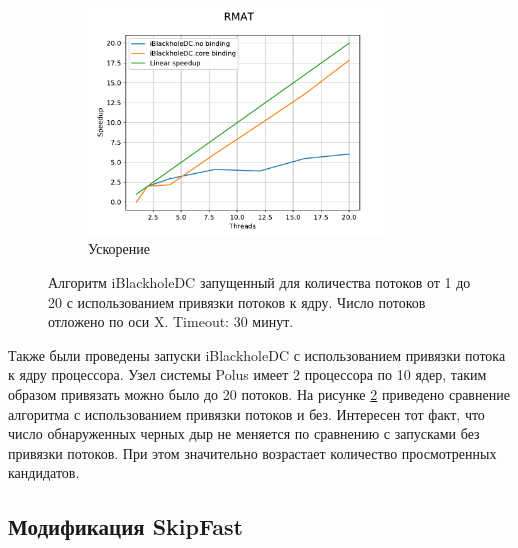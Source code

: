 \documentclass[12pt,a4paper,oneside,openany]{article}
\theoremstyle{definition}
\theoremstyle{lemma}
\theoremstyle{remark}
\begin{document}
\begin{figure}[H]
    \begin{subfigure}{.5\textwidth}
      \centering
      \includegraphics[width=8cm,height=6cm]{images/6_filtered_RMAT_speedup.pdf}
      \caption{Ускорение}
      \label{fig:chinesebinding:filteredspeedup}
    \end{subfigure}
    \caption{Алгоритм iBlackholeDC запущенный для количества потоков от 1 до 20 с использованием привязки потоков к ядру. Число потоков отложено по оси X. Timeout: 30 минут.}
    \label{fig:chinesebinding}
\end{figure}

Также были проведены запуски iBlackholeDC с использованием привязки потока к ядру процессора.
Узел системы Polus имеет 2 процессора по 10 ядер, таким образом привязать можно было до 20 потоков.
На рисунке \ref{fig:chinesebinding} приведено сравнение алгоритма с использованием привязки потоков
и без. Интересен тот факт, что число обнаруженных черных дыр не меняется по сравнению с запусками без
привязки потоков. При этом значительно возрастает количество просмотренных кандидатов.

\subsection{Модификация SkipFast}\label{subsec:fastskipexperiment}
\end{document}
